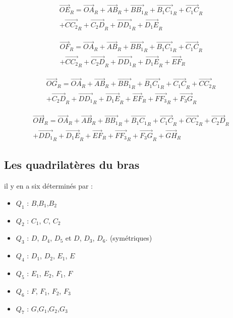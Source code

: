 \documentclass[12pt,a4paper,twoside]{article}
\begin{document}
\begin{equation}
\begin{split}
\vec{OE}_R=\vec{OA}_R+\vec{AB}_R+\vec{B B_1}_R+\vec{B_1 C_1}_R+\vec{C_1 C}_R\\+\vec{C C_2}_R+\vec{C_2 D}_R+\vec{D D_1}_R+\vec{D_1 E}_R
\end{split}
\end{equation}

\begin{equation}
\begin{split}
\vec{OF}_R=\vec{OA}_R+\vec{AB}_R+\vec{B B_1}_R+\vec{B_1 C_1}_R+\vec{C_1 C}_R\\+\vec{C C_2}_R+\vec{C_2 D}_R+\vec{D D_1}_R+\vec{D_1 E}_R+\vec{E F}_R
\end{split}
\end{equation}

\begin{equation}
\begin{split}
\vec{OG}_R=\vec{OA}_R+\vec{AB}_R+\vec{B B_1}_R+\vec{B_1 C_1}_R+\vec{C_1 C}_R+\vec{C C_2}_R\\+\vec{C_2 D}_R+\vec{D D_1}_R+\vec{D_1 E}_R+\vec{E F}_R+\vec{F F_3}_R+\vec{F_3 G}_R
\end{split}
\end{equation}

\begin{equation}
\begin{split}
\vec{OH}_R=\vec{OA}_R+\vec{AB}_R+\vec{B B_1}_R+\vec{B_1 C_1}_R+\vec{C_1 C}_R+\vec{C C_2}_R+\vec{C_2 D}_R\\+\vec{D D_1}_R+\vec{D_1 E}_R+\vec{E F}_R+\vec{F F_3}_R+\vec{F_3 G}_R+\vec{G H}_R
\end{split}
\end{equation}

\subsection{Les quadrilatères du bras}
il y en a six déterminés par : 

\begin{itemize}
	\item $Q_1$ : $B$,$B_1$,$B_2$
	\item $Q_2$ : $C_1$, $C$, $C_2$
	\item $Q_3$ : $D$, $D_4$, $D_5$ et $D$, $D_3$, $D_6$. (symétriques)
	\item $Q_4$ : $D_1$, $D_2$, $E_1$, $E$
	\item $Q_5$ : $E_1$, $E_2$, $F_1$, $F$
	\item $Q_6$ : $F$, $F_1$, $F_2$, $F_3$
	\item $Q_7$ : $G$,$G_1$,$G_2$,$G_3$
\end{itemize}
\end{document}
